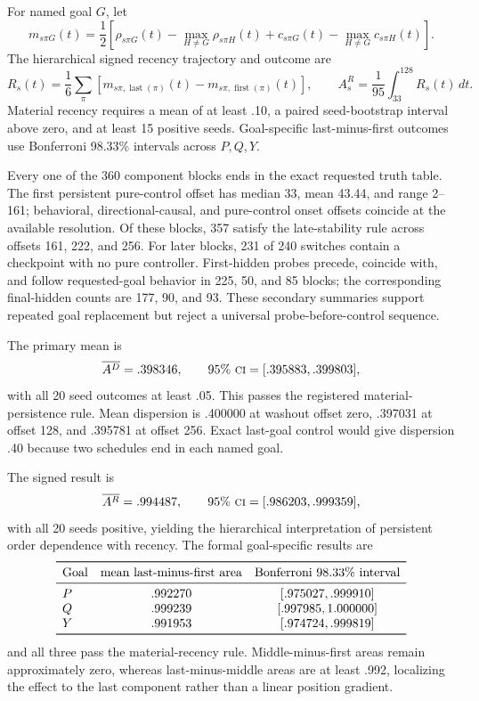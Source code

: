 \documentclass[11pt,a4paper]{article}
\newcommand{\CI}{\textsc{ci}}
\begin{document}
For named goal $G$, let
\[
m_{s\pi G}(t)=\frac12\left[
\rho_{s\pi G}(t)-\max_{H\ne G}\rho_{s\pi H}(t)
+c_{s\pi G}(t)-\max_{H\ne G}c_{s\pi H}(t)
\right].
\]
The hierarchical signed recency trajectory and outcome are
\[
R_s(t)=\frac16\sum_\pi
\left[m_{s\pi,\operatorname{last}(\pi)}(t)
-m_{s\pi,\operatorname{first}(\pi)}(t)\right],
\qquad
A^R_s=\frac1{95}\int_{33}^{128}R_s(t)\,dt.
\]
Material recency requires a mean of at least .10, a paired seed-bootstrap interval above zero, and at least 15 positive seeds. Goal-specific last-minus-first outcomes use Bonferroni 98.33\% intervals across $P,Q,Y$.

Every one of the 360 component blocks ends in the exact requested truth table. The first persistent pure-control offset has median 33, mean 43.44, and range 2--161; behavioral, directional-causal, and pure-control onset offsets coincide at the available resolution. Of these blocks, 357 satisfy the late-stability rule across offsets 161, 222, and 256. For later blocks, 231 of 240 switches contain a checkpoint with no pure controller. First-hidden probes precede, coincide with, and follow requested-goal behavior in 225, 50, and 85 blocks; the corresponding final-hidden counts are 177, 90, and 93. These secondary summaries support repeated goal replacement but reject a universal probe-before-control sequence.

The primary mean is
\[
\overline{A^D}=.398346,\qquad
95\%\ \CI{}=[.395883,.399803],
\]
with all 20 seed outcomes at least .05. This passes the registered material-persistence rule. Mean dispersion is .400000 at washout offset zero, .397031 at offset 128, and .395781 at offset 256. Exact last-goal control would give dispersion .40 because two schedules end in each named goal.

The signed result is
\[
\overline{A^R}=.994487,\qquad
95\%\ \CI{}=[.986203,.999359],
\]
with all 20 seeds positive, yielding the hierarchical interpretation of persistent order dependence with recency. The formal goal-specific results are
\[
\begin{array}{lcc}
\toprule
\text{Goal} & \text{mean last-minus-first area} & \text{Bonferroni }98.33\%\text{ interval}\\
\midrule
P & .992270 & [.975027,.999910]\\
Q & .999239 & [.997985,1.000000]\\
Y & .991953 & [.974724,.999819]\\
\bottomrule
\end{array}
\]
and all three pass the material-recency rule. Middle-minus-first areas remain approximately zero, whereas last-minus-middle areas are at least .992, localizing the effect to the last component rather than a linear position gradient.
\end{document}
